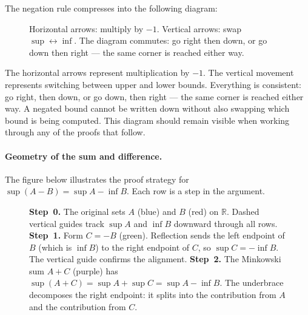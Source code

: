 The negation rule compresses into the following diagram:

\begin{figure}[h]
\centering
{}
\caption{Horizontal arrows: multiply by $-1$.
Vertical arrows: swap $\sup \leftrightarrow \inf$.
The diagram commutes: go right then down, or go down then right —
the same corner is reached either way.}
\label{fig:negation-symmetry}
\end{figure}

The horizontal arrows represent multiplication by $-1$.
The vertical movement represents switching between upper and lower bounds.
Everything is consistent: go right, then down, or go down, then right —
the same corner is reached either way.
A negated bound cannot be written down without also swapping which bound
is being computed.
This diagram should remain visible when working through any of the proofs
that follow.

\paragraph{Geometry of the sum and difference.}

The figure below illustrates the proof strategy for
$\sup(A-B) = \sup A - \inf B$.
Each row is a step in the argument.

\begin{figure}[h]
\centering

\caption{%
\textbf{Step~0.} The original sets $A$ (blue) and $B$ (red) on $\mathbb{R}$.
Dashed vertical guides track $\sup A$ and $\inf B$ downward through all rows.
\textbf{Step~1.} Form $C = -B$ (green). Reflection sends the left endpoint
of $B$ (which is $\inf B$) to the right endpoint of $C$,
so $\sup C = -\inf B$. The vertical guide confirms the alignment.
\textbf{Step~2.} The Minkowski sum $A + C$ (purple) has
$\sup(A+C) = \sup A + \sup C = \sup A - \inf B$.
The underbrace decomposes the right endpoint: it splits into the
contribution from $A$ and the contribution from $C$.}
\label{fig:sup-diff-geometry}
\end{figure}

